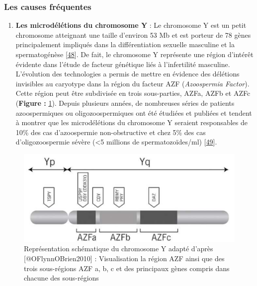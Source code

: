 \documentclass[12pt,twoside]{reedthesis}
\providecommand{\tightlist}{%
  \setlength{\itemsep}{0pt}\setlength{\parskip}{0pt}}
\theoremstyle{definition}
\theoremstyle{definition}
\theoremstyle{remark}
\begin{document}
  \subsubsection{Les causes fréquentes}\label{les-causes-frequentes}
  
  \begin{enumerate}
  \def\labelenumi{\arabic{enumi}.}
  \tightlist
  \item
    \textbf{Les microdélétions du chromosome Y} : Le chromosome Y est un
    petit chromosome atteignant une taille d'environ 53 Mb et est porteur
    de 78 gènes principalement impliqués dans la différentiation sexuelle
    masculine et la spermatogénèse
    {[}\protect\hyperlink{ref-Skaletsky2003}{48}{]}. De fait, le
    chromosome Y représente une région d'intérêt évidente dans l'étude de
    facteur génétique liés à l'infertilité masculine. L'évolution des
    technologies a permis de mettre en évidence des délétions invisibles
    au caryotype dans la région du facteur AZF (\emph{Azoospermia
    Factor}). Cette région peut être subdivisée en trois sous-parties,
    AZFa, AZFb et AZFc (\textbf{Figure :} \ref{fig:chry}). Depuis
    plusieurs années, de nombreuses séries de patients azoospermiques ou
    oligozoospermiques ont été étudiées et publiées et tendent à montrer
    que les microdélétions du chromosome Y seraient responsables de 10\%
    des cas d'azoospermie non-obstructive et chez 5\% des cas
    d'oligozoospermie sévère (\textless{}5 millions de spermatozoïdes/ml)
    {[}\protect\hyperlink{ref-Hotaling2014}{49}{]}.
  \end{enumerate}
  
  \newpage
  
  \begin{figure}
  
  {\centering \includegraphics[scale=.45]{figure/chromozomeY} 
  
  }
  
  \caption[Représentation schématique du chromosome Y adapté]{Représentation schématique du chromosome Y adapté d'après [@OFlynnOBrien2010] : Visualisation la région AZF ainsi que des trois sous-régions AZF a, b, c et des principaux gènes compris dans chacune des sous-régions}\label{fig:chry}
  \end{figure}
  
\end{document}
